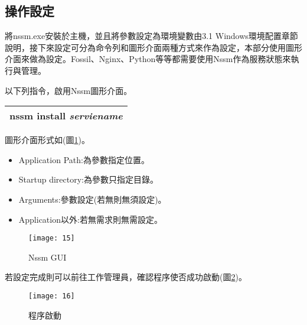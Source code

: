 \subsection{操作設定}
\par
\renewcommand{\baselinestretch}{1} %
\twelve 將nssm.exe安裝於主機，並且將參數設定為環境變數由3.1 Windows環境配置章節說明，接下來設定可分為命令列和圖形介面兩種方式來作為設定，本部分使用圖形介面來做為設定。Fossil、Nginx、Python等等都需要使用Nssm作為服務狀態來執行與管理。
\par
\renewcommand{\baselinestretch}{1} %
\twelve 以下列指令，啟用Nssm圖形介面。
\par
\begin{center}
\begin{tabular}{||p{15cm}|} %
\hline
\textbf{nssm install} \emph{serviename} 
\\
\hline
\end{tabular}
\end{center}
\par
\renewcommand{\baselinestretch}{1} %
\twelve 圖形介面形式如(圖\ref{fig.Nssm GUI})。
\par
\begin{itemize}
	\item Application Path:為參數指定位置。
	\item Startup directory:為參數只指定目錄。
	\item Arguments:參數設定(若無則無須設定)。
	\item Application以外:若無需求則無需設定。
\end{itemize}
\par
\renewcommand{\baselinestretch}{1.7} %
\begin{figure}[hbt!]
\begin{center}
\texttt{[image: 15]}
\caption{\large Nssm GUI}\label{fig.Nssm GUI}
\end{center}
\end{figure}
\par
\renewcommand{\baselinestretch}{1} %
\twelve 若設定完成則可以前往工作管理員，確認程序使否成功啟動(圖\ref{fig.程序啟動})。
\par
\renewcommand{\baselinestretch}{1.7} %
\begin{figure}[hbt!]
\begin{center}
\texttt{[image: 16]}
\caption{\large 程序啟動}\label{fig.程序啟動}
\end{center}
\end{figure}
\par

